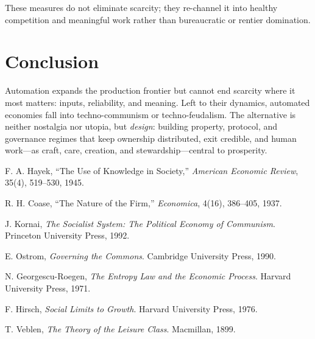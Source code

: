 \documentclass[12pt]{article}
\begin{document}
These measures do not eliminate scarcity; they re-channel it into healthy competition and meaningful work rather than bureaucratic or rentier domination.

\section{Conclusion}
Automation expands the production frontier but cannot end scarcity where it most matters: inputs, reliability, and meaning. Left to their dynamics, automated economies fall into techno-communism or techno-feudalism. The alternative is neither nostalgia nor utopia, but \emph{design}: building property, protocol, and governance regimes that keep ownership distributed, exit credible, and human work---as craft, care, creation, and stewardship---central to prosperity.

\begin{thebibliography}{9}
F. A. Hayek, ``The Use of Knowledge in Society,'' \emph{American Economic Review}, 35(4), 519--530, 1945.

R. H. Coase, ``The Nature of the Firm,'' \emph{Economica}, 4(16), 386--405, 1937.

J. Kornai, \emph{The Socialist System: The Political Economy of Communism}. Princeton University Press, 1992.

E. Ostrom, \emph{Governing the Commons}. Cambridge University Press, 1990.

N. Georgescu-Roegen, \emph{The Entropy Law and the Economic Process}. Harvard University Press, 1971.

F. Hirsch, \emph{Social Limits to Growth}. Harvard University Press, 1976.

T. Veblen, \emph{The Theory of the Leisure Class}. Macmillan, 1899.
\end{thebibliography}
\end{document}
